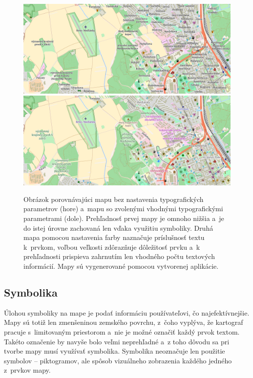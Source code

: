 \begin{figure}[hbt]
	\centering
	\includegraphics[width=1\textwidth]{obrazky-figures/bad_typography.pdf}\hfill
	\includegraphics[width=1\textwidth]{obrazky-figures/good_typography.pdf}\hfill
	\caption{Obrázok porovnávajúci mapu bez nastavenia typografických parametrov (hore) a~mapu so zvolenými vhodnými typografickými parametrami (dole). Prehľadnosť prvej mapy je omnoho nižšia a~je do istej úrovne zachovaná len vďaka využitiu symboliky. Druhá mapa pomocou nastavenia farby naznačuje príslušnosť textu k~prvkom, voľbou veľkosti zdôrazňuje dôležitosť prvku a~k prehľadnosti prispieva zahrnutím len vhodného počtu textových informácií. Mapy sú vygenerované pomocou vytvorenej aplikácie.}
	\label{img_typography}
\end{figure}

\subsection*{Symbolika}
Úlohou symboliky na mape je podať informáciu používateľovi, čo najefektívnejšie. Mapy sú totiž len zmenšeninou zemského povrchu, z~čoho vyplýva, že kartograf pracuje s~limitovaným priestorom a~nie je možné označiť každý prvok textom. Takéto označenie by navyše bolo veľmi neprehľadné a~z toho dôvodu sa pri tvorbe mapy musí využívať symbolika. Symbolika neoznačuje len použitie symbolov -- piktogramov, ale spôsob vizuálneho zobrazenia každého jedného z~prvkov mapy. 

